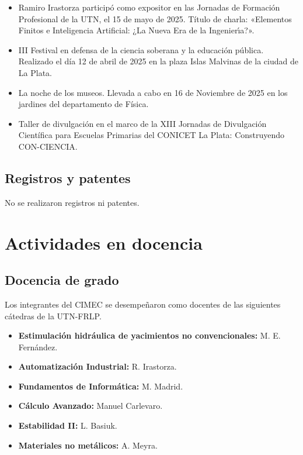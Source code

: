 \documentclass[a4paper,11pt,twoside,final,titlepage,onecolumn,openright]{report}
\begin{document}
\begin{itemize}
	\item Ramiro Irastorza participó como expositor en las Jornadas de Formación Profesional de la UTN, el 15 de mayo de 2025. Título de charla: «Elementos Finitos e Inteligencia Artificial: ¿La Nueva Era de la Ingenierı́a?».
  \item III Festival en defensa de la ciencia soberana y la educación pública. Realizado el día 12 de abril de 2025 en la plaza Islas Malvinas de la ciudad de La Plata.
  \item La noche de los museos. Llevada a cabo en 16 de Noviembre de 2025 en los jardines del departamento de Física.
  \item Taller de divulgación en el marco de la XIII Jornadas de Divulgación Científica para Escuelas Primarias del CONICET La Plata: Construyendo CON-CIENCIA.
\end{itemize}

\section{Registros y patentes}

No se realizaron registros ni patentes.


\chapter{Actividades en docencia}

\section{Docencia de grado}

Los integrantes del CIMEC se desempeñaron como docentes de las siguientes cátedras de la UTN-FRLP.

\begin{itemize}
	\item {\bf Estimulación hidráulica de yacimientos no convencionales:} M. E. Fernández.
	\item {\bf Automatización Industrial:} R. Irastorza.
	\item {\bf Fundamentos de Informática:} M. Madrid.
	\item {\bf Cálculo Avanzado:} Manuel Carlevaro.
	\item \textbf{Estabilidad II:} L. Basiuk.
	\item \textbf{Materiales no metálicos:} A. Meyra.
\end{itemize}
\end{document}
